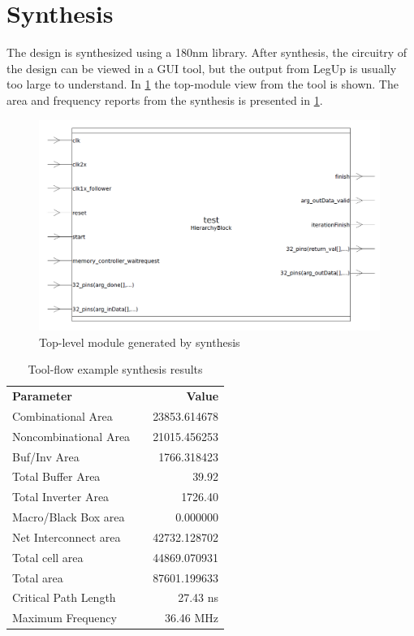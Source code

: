 \section{Synthesis}
The design is synthesized using a 180nm library. After synthesis, the circuitry of the design can be viewed in a GUI tool, but the output from LegUp is usually too large to understand. In \cref{fig:synthesiscircuittop} the top-module view from the tool is shown. The area and frequency reports from the synthesis is presented in \cref{tab:synthreportex}.

\begin{figure}[hbpt]
\centering
\includegraphics[width=0.99\textwidth]{../figs/SynthesisCircuit.png}
\caption{\label{fig:synthesiscircuittop}Top-level module generated by synthesis}
\end{figure}
\begin{table}[hbpt]
    \centering
    \begin{tabular}{lcr}
        \textbf{Parameter} && \textbf{Value} \\
        Combinational Area && 23853.614678 \\
        Noncombinational Area && 21015.456253 \\
        Buf/Inv Area && 1766.318423 \\
        Total Buffer Area && 39.92 \\
        Total Inverter Area && 1726.40 \\
        Macro/Black Box area && 0.000000 \\
        Net Interconnect area && 42732.128702 \\
        \midrule
        Total cell area && 44869.070931 \\
        Total area && 87601.199633 \\
        \midrule
        Critical Path Length && 27.43 ns \\
        Maximum Frequency && 36.46 MHz\\
        \bottomrule
    \end{tabular}
    \caption{Tool-flow example synthesis results}
    \label{tab:synthreportex}
\end{table}
